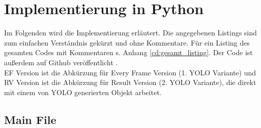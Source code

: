
\section{Implementierung in Python} 
{\label{implementation_in_python}} 
Im Folgenden wird die Implementierung erläutert. Die angegebenen Listings sind zum einfachen Verständnis gekürzt und ohne Kommentare. Für ein Listing des gesamten Codes mit Kommentaren s. Anhang \ref{cd:gesamt_listing}. Der Code ist außerdem auf Github veröffentlicht \citep{Lietmeyer2023}.\\ 
EF Version ist die Abkürzung für \glqq Every Frame\grqq{} Version (1. YOLO Variante) und RV Version ist die Abkürzung für \glqq Result\grqq{} Version (2. YOLO Variante), die direkt mit einem von YOLO generierten Objekt arbeitet. 
\subsection{Main File}
